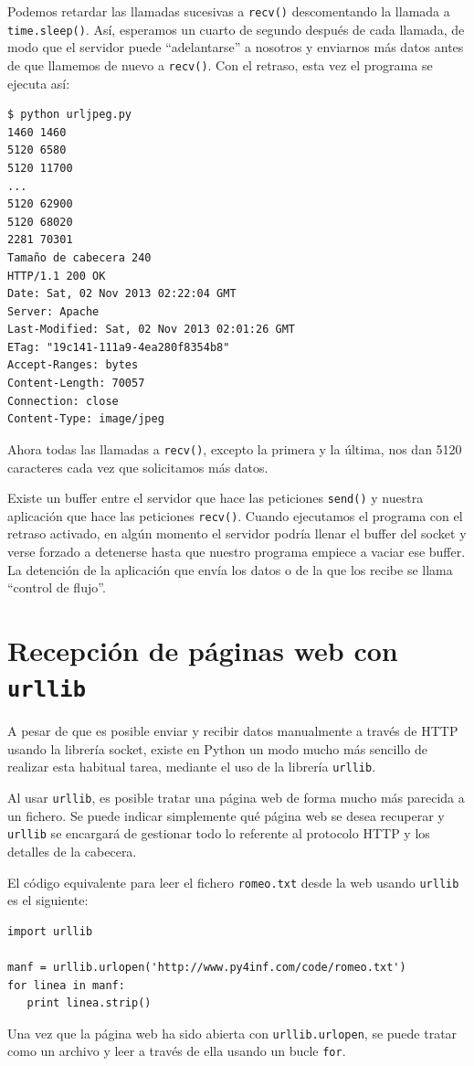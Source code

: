 Podemos retardar las llamadas sucesivas a {\tt recv()} descomentando la llamada
a {\tt time.sleep()}. Así, esperamos un cuarto de segundo después de cada llamada,
de modo que el servidor puede ``adelantarse'' a nosotros y enviarnos más datos
antes de que llamemos de nuevo a {\tt recv()}. Con el retraso, esta vez el programa
se ejecuta así:
\beforeverb
\begin{verbatim}
$ python urljpeg.py 
1460 1460
5120 6580
5120 11700
...
5120 62900
5120 68020
2281 70301
Tamaño de cabecera 240
HTTP/1.1 200 OK
Date: Sat, 02 Nov 2013 02:22:04 GMT
Server: Apache
Last-Modified: Sat, 02 Nov 2013 02:01:26 GMT
ETag: "19c141-111a9-4ea280f8354b8"
Accept-Ranges: bytes
Content-Length: 70057
Connection: close
Content-Type: image/jpeg
\end{verbatim}
\afterverb
%
Ahora todas las llamadas a {\tt recv()}, excepto la primera y la última,
nos dan 5120 caracteres cada vez que solicitamos más datos.

Existe un buffer entre el servidor que hace las peticiones {\tt send()}
y nuestra aplicación que hace las peticiones {\tt recv()}. Cuando ejecutamos
el programa con el retraso activado, en algún momento el servidor podría
llenar el buffer del socket y verse forzado a detenerse hasta que
nuestro programa empiece a vaciar ese buffer. La detención de la aplicación
que envía los datos o de la que los recibe se llama
``control de flujo''.

\section{Recepción de páginas web con {\tt urllib}}

A pesar de que es posible enviar y recibir datos manualmente a través de HTTP
usando la librería socket, existe en Python un modo mucho más sencillo de
realizar esta habitual tarea,
mediante el uso de la librería {\tt urllib}.

Al usar {\tt urllib},
es posible tratar una página web de forma mucho más parecida a un fichero. Se puede
indicar simplemente qué página web se desea recuperar y
{\tt urllib} se encargará de gestionar todo lo referente al protocolo HTTP y
los detalles de la cabecera.

El código equivalente para leer el fichero {\tt romeo.txt}
desde la web usando {\tt urllib} es el siguiente:

\beforeverb
\begin{verbatim}
import urllib

manf = urllib.urlopen('http://www.py4inf.com/code/romeo.txt')
for linea in manf:
   print linea.strip()
\end{verbatim}
\afterverb
%
Una vez que la página web ha sido abierta con
{\tt urllib.urlopen}, se puede tratar como
un archivo y leer a través de ella usando un
bucle {\tt for}.

